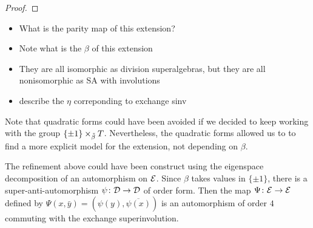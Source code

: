 \begin{proof}
    
    
    
\end{proof}

\begin{itemize}
    \item What is the parity map of this extension?
    \item Note what is the $\beta$ of this extension
    \item They are all isomorphic as division superalgebras, but they are all nonisomorphic as SA with involutions
    \item describe the $\eta$ correponding to exchange sinv
\end{itemize}

\begin{remark}
    Note that quadratic forms could have been avoided if we decided to keep working with the group $\{ \pm 1 \} \times_{\tilde\beta} T$. 
    Nevertheless, the quadratic forms allowed us to to find a more explicit model for the extension, not depending on $\beta$.
\end{remark}

\begin{remark}
    The refinement above could have been construct using the eigenspace decomposition of an automorphism on $\mathcal E$. 
    Since $\beta$ takes values in $\{ \pm 1 \}$, there is a super-anti-automorphism $\psi\colon \mathcal{D} \to \mathcal{D}$ of order form. 
    Then the map $\Psi\colon \mathcal E \to \mathcal E$ defined by $\Psi(x, \bar y) = (\psi (y), \overline{\psi(x)})$ is an automorphism of order $4$ commuting with the exchange superinvolution.
\end{remark}

